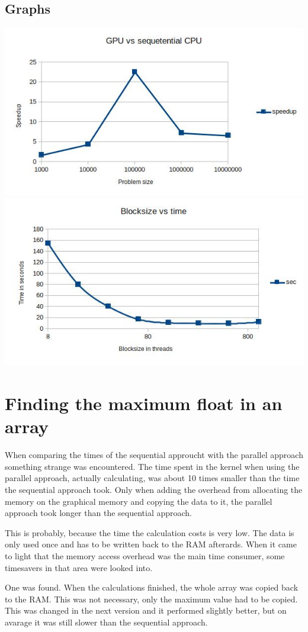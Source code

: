 \documentclass[12pt]{article}
\begin{document}
\subsection{Graphs}
\includegraphics[width=\textwidth]{speedup.jpg}
\includegraphics[width=\textwidth]{blocksize.jpg}



\section{Finding the maximum float in an array}
When comparing the times of the sequential approucht with the parallel approach
something strange was encountered. The time spent in the kernel when using the
parallel approach, actually calculating, was about 10 times smaller than the
time the sequential approach took. Only when adding the overhead from
allocating the memory on the graphical memory and copying the data to it, the
parallel approach took longer than the sequential approach.

This is probably, because the time the calculation costs is very low. The data
is only used once and has to be written back to the RAM afterards. When it came
to light that the memory access overhead was the main time consumer, some
timesavers in that area were looked into.

One was found. When the calculations finished, the whole array was copied back
to the RAM. This was not necessary, only the maximum value had to be copied.
This was changed in the next version and it performed slightly better, but on
avarage it was still slower than the sequential approach.
\end{document}
